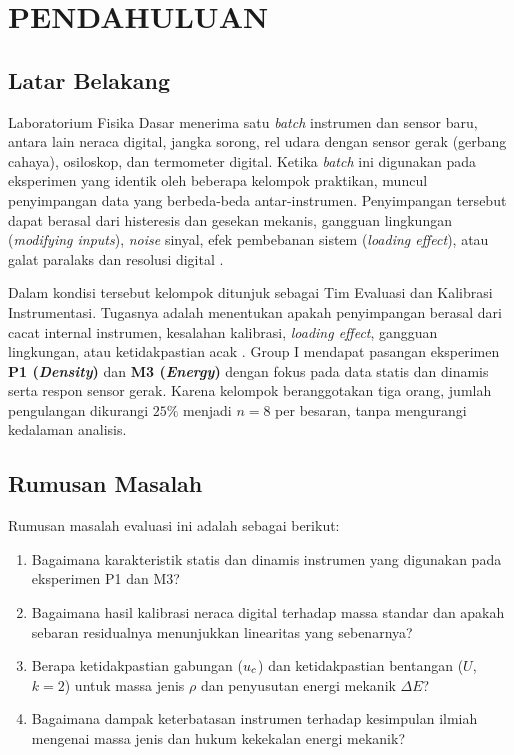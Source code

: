 \documentclass[a4paper, 12pt]{article}
\begin{document}
    
    

\newpage
\section{PENDAHULUAN}
        \subsection{Latar Belakang}
        Laboratorium Fisika Dasar menerima satu \textit{batch} instrumen dan sensor baru, antara lain neraca digital, jangka sorong, rel udara dengan sensor gerak (gerbang cahaya), osiloskop, dan termometer digital. Ketika \textit{batch} ini digunakan pada eksperimen yang identik oleh beberapa kelompok praktikan, muncul penyimpangan data yang berbeda-beda antar-instrumen. Penyimpangan tersebut dapat berasal dari histeresis dan gesekan mekanis, gangguan lingkungan (\textit{modifying inputs}), \textit{noise} sinyal, efek pembebanan sistem (\textit{loading effect}), atau galat paralaks dan resolusi digital \parencite{Bentley2005}.

        Dalam kondisi tersebut kelompok ditunjuk sebagai Tim Evaluasi dan Kalibrasi Instrumentasi. Tugasnya adalah menentukan apakah penyimpangan berasal dari cacat internal instrumen, kesalahan kalibrasi, \textit{loading effect}, gangguan lingkungan, atau ketidakpastian acak \parencite{Yhuwana2026}. Group I mendapat pasangan eksperimen \textbf{P1 (\textit{Density})} dan \textbf{M3 (\textit{Energy})} dengan fokus pada data statis dan dinamis serta respon sensor gerak. Karena kelompok beranggotakan tiga orang, jumlah pengulangan dikurangi $25\%$ menjadi $n=8$ per besaran, tanpa mengurangi kedalaman analisis.

        \subsection{Rumusan Masalah}
        Rumusan masalah evaluasi ini adalah sebagai berikut:
        \begin{enumerate}
            \item Bagaimana karakteristik statis dan dinamis instrumen yang digunakan pada eksperimen P1 dan M3?
            \item Bagaimana hasil kalibrasi neraca digital terhadap massa standar dan apakah sebaran residualnya menunjukkan linearitas yang sebenarnya?
            \item Berapa ketidakpastian gabungan ($u_{c}$) dan ketidakpastian bentangan ($U$, $k=2$) untuk massa jenis $\rho$ dan penyusutan energi mekanik $\Delta E$?
            \item Bagaimana dampak keterbatasan instrumen terhadap kesimpulan ilmiah mengenai massa jenis dan hukum kekekalan energi mekanik?
        \end{enumerate}
\end{document}
